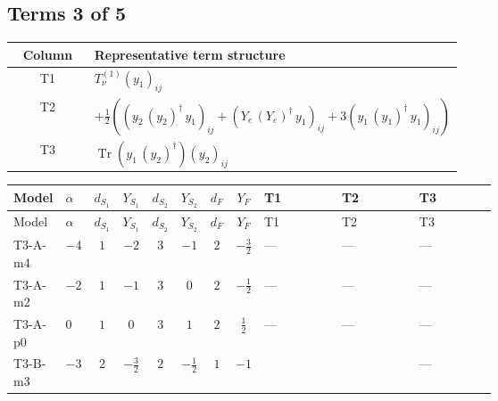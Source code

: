 \documentclass[8pt]{article}
\begin{document}
\begin{landscape}
\subsection*{Terms 3 of 5}
\begin{center}
\begin{tabular}{@{}c >{\raggedright\arraybackslash}p{0.82\linewidth}@{}}
\toprule
Column & Representative term structure \\
\midrule
T1 & \(\displaystyle T_{\nu}^{(1)} \left({y_1}\right)_{ij}\) \\
\midrule
T2 & \(\displaystyle +\frac{1}{2} (\left({y_2}\,\left({y_2}\right)^{\dagger}\,{y_1}\right)_{ij}+\left({Y_e}\,\left({Y_e}\right)^{\dagger}\,{y_1}\right)_{ij}+3 \left({y_1}\,\left({y_1}\right)^{\dagger}\,{y_1}\right)_{ij})\) \\
\midrule
T3 & \(\displaystyle \operatorname{Tr}\!\left({y_1}\,\left({y_2}\right)^{\dagger}\right) \left({y_2}\right)_{ij}\) \\
\midrule
\bottomrule
\end{tabular}
\end{center}
\smallskip
\tiny
\begin{longtable}{@{}llcccccc >{\raggedright\arraybackslash}p{0.21\linewidth} >{\raggedright\arraybackslash}p{0.21\linewidth} >{\raggedright\arraybackslash}p{0.21\linewidth}@{}}
\toprule
Model & $\alpha$ & $d_{S_1}$ & $Y_{S_1}$ & $d_{S_2}$ & $Y_{S_2}$ & $d_F$ & $Y_F$ & T1 & T2 & T3 \\
\midrule
\endfirsthead
\toprule
Model & $\alpha$ & $d_{S_1}$ & $Y_{S_1}$ & $d_{S_2}$ & $Y_{S_2}$ & $d_F$ & $Y_F$ & T1 & T2 & T3 \\
\midrule
\endhead
T3-A-m4 & $-4$ & $1$ & $-2$ & $3$ & $-1$ & $2$ & $-\frac{3}{2}$ & --- & --- & --- \\
\midrule
T3-A-m2 & $-2$ & $1$ & $-1$ & $3$ & $0$ & $2$ & $-\frac{1}{2}$ & --- & --- & --- \\
\midrule
T3-A-p0 & $0$ & $1$ & $0$ & $3$ & $1$ & $2$ & $\frac{1}{2}$ & --- & --- & --- \\
\midrule
T3-B-m3 & $-3$ & $2$ & $-\frac{3}{2}$ & $2$ & $-\frac{1}{2}$ & $1$ & $-1$ & \scriptsize\adjustbox{max width=\linewidth}{$\begin{gathered} T_{\nu}^{(1)} \left({y_1}\right)_{ij}\end{gathered}$} & \scriptsize\adjustbox{max width=\linewidth}{$\begin{gathered} +\frac{1}{2} (\left({y_2}\,\left({y_2}\right)^{\dagger}\,{y_1}\right)_{ij}+\left({Y_e}\,\left({Y_e}\right)^{\dagger}\,{y_1}\right)_{ij}+3 \left({y_1}\,\left({y_1}\right)^{\dagger}\,{y_1}\right)_{ij})\end{gathered}$} & --- \\

\end{longtable}
\end{landscape}
\end{document}
